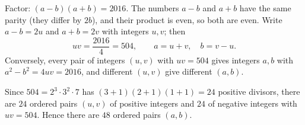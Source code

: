 Factor: $(a-b)(a+b)=2016$. The numbers $a-b$ and $a+b$ have the same parity (they differ by $2b$), and their product is even, so both are even. Write $a-b=2u$ and $a+b=2v$ with integers $u,v$; then
\[
uv=\dfrac{2016}{4}=504,\qquad a=u+v,\quad b=v-u .
\]
Conversely, every pair of integers $(u,v)$ with $uv=504$ gives integers $a,b$ with $a^2-b^2=4uv=2016$, and different $(u,v)$ give different $(a,b)$.

Since $504=2^3\cdot3^2\cdot7$ has $(3+1)(2+1)(1+1)=24$ positive divisors, there are $24$ ordered pairs $(u,v)$ of positive integers and $24$ of negative integers with $uv=504$. Hence there are $\boxed{48}$ ordered pairs $(a,b)$.
